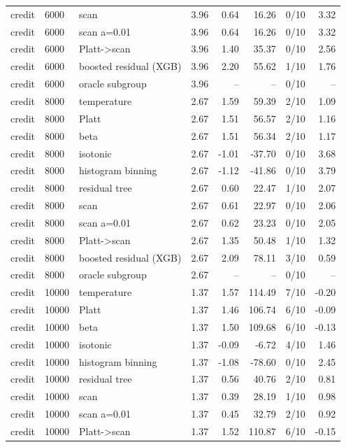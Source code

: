 \begin{tabular}{lllrrrlr}
credit & 6000 & scan & 3.96 & 0.64 & 16.26 & 0/10 & 3.32 \\
credit & 6000 & scan a=0.01 & 3.96 & 0.64 & 16.26 & 0/10 & 3.32 \\
credit & 6000 & Platt->scan & 3.96 & 1.40 & 35.37 & 0/10 & 2.56 \\
credit & 6000 & boosted residual (XGB) & 3.96 & 2.20 & 55.62 & 1/10 & 1.76 \\
credit & 6000 & oracle subgroup & 3.96 & -- & -- & 0/10 & -- \\
credit & 8000 & temperature & 2.67 & 1.59 & 59.39 & 2/10 & 1.09 \\
credit & 8000 & Platt & 2.67 & 1.51 & 56.57 & 2/10 & 1.16 \\
credit & 8000 & beta & 2.67 & 1.51 & 56.34 & 2/10 & 1.17 \\
credit & 8000 & isotonic & 2.67 & -1.01 & -37.70 & 0/10 & 3.68 \\
credit & 8000 & histogram binning & 2.67 & -1.12 & -41.86 & 0/10 & 3.79 \\
credit & 8000 & residual tree & 2.67 & 0.60 & 22.47 & 1/10 & 2.07 \\
credit & 8000 & scan & 2.67 & 0.61 & 22.97 & 0/10 & 2.06 \\
credit & 8000 & scan a=0.01 & 2.67 & 0.62 & 23.23 & 0/10 & 2.05 \\
credit & 8000 & Platt->scan & 2.67 & 1.35 & 50.48 & 1/10 & 1.32 \\
credit & 8000 & boosted residual (XGB) & 2.67 & 2.09 & 78.11 & 3/10 & 0.59 \\
credit & 8000 & oracle subgroup & 2.67 & -- & -- & 0/10 & -- \\
credit & 10000 & temperature & 1.37 & 1.57 & 114.49 & 7/10 & -0.20 \\
credit & 10000 & Platt & 1.37 & 1.46 & 106.74 & 6/10 & -0.09 \\
credit & 10000 & beta & 1.37 & 1.50 & 109.68 & 6/10 & -0.13 \\
credit & 10000 & isotonic & 1.37 & -0.09 & -6.72 & 4/10 & 1.46 \\
credit & 10000 & histogram binning & 1.37 & -1.08 & -78.60 & 0/10 & 2.45 \\
credit & 10000 & residual tree & 1.37 & 0.56 & 40.76 & 2/10 & 0.81 \\
credit & 10000 & scan & 1.37 & 0.39 & 28.19 & 1/10 & 0.98 \\
credit & 10000 & scan a=0.01 & 1.37 & 0.45 & 32.79 & 2/10 & 0.92 \\
credit & 10000 & Platt->scan & 1.37 & 1.52 & 110.87 & 6/10 & -0.15 \\

\end{tabular}
